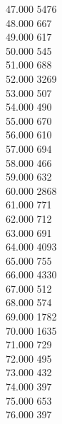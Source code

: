 { 47.000	5476 \\
 48.000	667 \\
 49.000	617 \\
 50.000	545 \\
 51.000	688 \\
 52.000	3269 \\
 53.000	507 \\
 54.000	490 \\
 55.000	670 \\
 56.000	610 \\
 57.000	694 \\
 58.000	466 \\
 59.000	632 \\
 60.000	2868 \\
 61.000	771 \\
 62.000	712 \\
 63.000	691 \\
 64.000	4093 \\
 65.000	755 \\
 66.000	4330 \\
 67.000	512 \\
 68.000	574 \\
 69.000	1782 \\
 70.000	1635 \\
 71.000	729 \\
 72.000	495 \\
 73.000	432 \\
 74.000	397 \\
 75.000	653 \\
 76.000	397 \\
}
